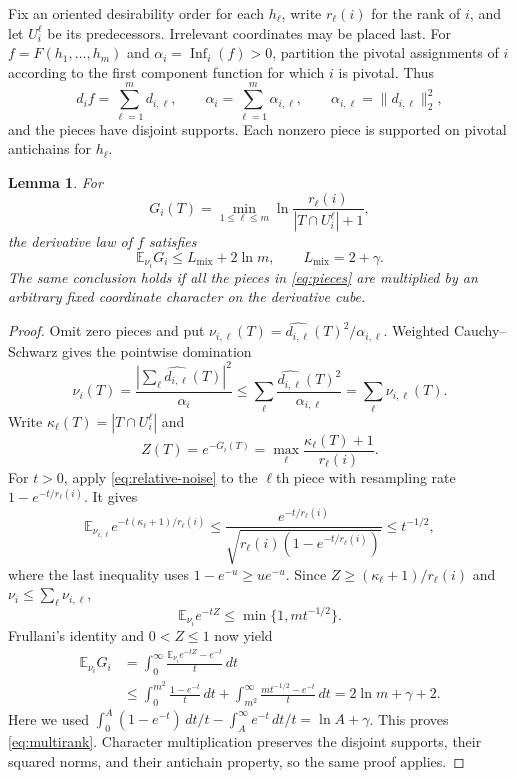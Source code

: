 \documentclass[11pt]{amsart}
\newtheorem{lemma}[theorem]{Lemma}
\theoremstyle{definition}
\theoremstyle{remark}
\newcommand{\E}{\mathbb E}
\DeclareMathOperator{\Inf}{Inf}
\newcommand{\wh}[1]{\widehat{#1}}
\newcommand{\Lmix}{L_{\mathrm{mix}}}
\begin{document}
Fix an oriented desirability order for each $h_\ell$, write $r_\ell(i)$ for the rank of $i$, and let $U_i^\ell$ be its predecessors.
Irrelevant coordinates may be placed last.
For $f=F(h_1,\ldots,h_m)$ and $\alpha_i=\Inf_i(f)>0$, partition the pivotal assignments of $i$ according to the first component function for which $i$ is pivotal.
Thus
\begin{equation}\label{eq:pieces}
 d_i f=\sum_{\ell=1}^m d_{i,\ell},\qquad
 \alpha_i=\sum_{\ell=1}^m\alpha_{i,\ell},
 \qquad \alpha_{i,\ell}=\|d_{i,\ell}\|_2^2,
\end{equation}
and the pieces have disjoint supports.
Each nonzero piece is supported on pivotal antichains for $h_\ell$.

\begin{lemma}\label{lem:multi-rank}
For
\[
 G_i(T)=\min_{1\le\ell\le m}
       \ln\frac{r_\ell(i)}{|T\cap U_i^\ell|+1},
\]
the derivative law of $f$ satisfies
\begin{equation}\label{eq:multirank}
 \E_{\nu_i}G_i\le\Lmix+2\ln m,
 \qquad \Lmix=2+\gamma.
\end{equation}
The same conclusion holds if all the pieces in \eqref{eq:pieces} are multiplied by an arbitrary fixed coordinate character on the derivative cube.
\end{lemma}
\begin{proof}
Omit zero pieces and put
$\nu_{i,\ell}(T)=\wh{d_{i,\ell}}(T)^2/\alpha_{i,\ell}$.
Weighted Cauchy--Schwarz gives the pointwise domination
\[
 \nu_i(T)
 =\frac{|\sum_\ell\wh{d_{i,\ell}}(T)|^2}{\alpha_i}
 \le\sum_\ell\frac{\wh{d_{i,\ell}}(T)^2}{\alpha_{i,\ell}}
 =\sum_\ell\nu_{i,\ell}(T).
\]
Write $\kappa_\ell(T)=|T\cap U_i^\ell|$ and
\[
 Z(T)=e^{-G_i(T)}
     =\max_\ell\frac{\kappa_\ell(T)+1}{r_\ell(i)}.
\]
For $t>0$, apply \eqref{eq:relative-noise} to the $\ell$th piece
with resampling rate $1-e^{-t/r_\ell(i)}$. It gives
\[
 \E_{\nu_{i,\ell}}e^{-t(\kappa_\ell+1)/r_\ell(i)}
 \le\frac{e^{-t/r_\ell(i)}}
          {\sqrt{r_\ell(i)(1-e^{-t/r_\ell(i)})}}
 \le t^{-1/2},
\]
where the last inequality uses $1-e^{-u}\ge ue^{-u}$.
Since $Z\ge(\kappa_\ell+1)/r_\ell(i)$ and
$\nu_i\le\sum_\ell\nu_{i,\ell}$,
\[
 \E_{\nu_i}e^{-tZ}\le\min\{1,mt^{-1/2}\}.
\]
Frullani's identity and $0<Z\le1$ now yield
\begin{align*}
 \E_{\nu_i}G_i
 &=\int_0^\infty\frac{\E_{\nu_i}e^{-tZ}-e^{-t}}t\,dt\\
 &\le\int_0^{m^2}\frac{1-e^{-t}}t\,dt
      +\int_{m^2}^\infty\frac{mt^{-1/2}-e^{-t}}t\,dt
 =2\ln m+\gamma+2.
\end{align*}
Here we used
$\int_0^A(1-e^{-t})\,dt/t-\int_A^\infty e^{-t}\,dt/t=\ln A+\gamma$.
This proves \eqref{eq:multirank}.
Character multiplication preserves the disjoint supports, their squared norms, and their antichain property, so the same proof applies.
\end{proof}
\end{document}
